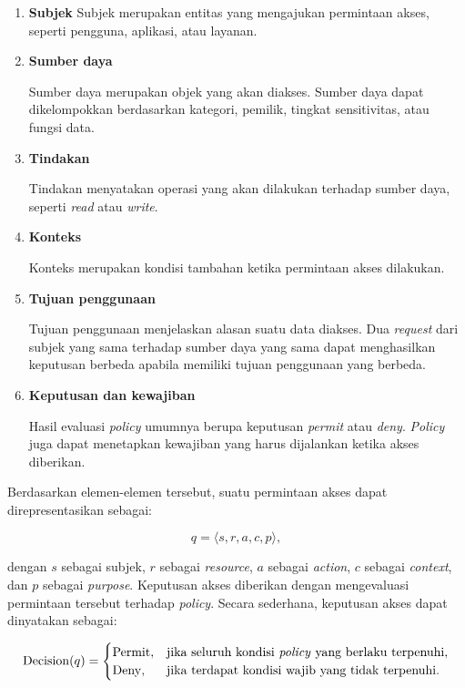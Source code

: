\begin{enumerate}
	\item \textbf{Subjek}
	      Subjek merupakan entitas yang mengajukan permintaan akses, seperti pengguna, aplikasi, atau layanan.

	\item \textbf{Sumber daya}

	      Sumber daya merupakan objek yang akan diakses. Sumber daya dapat dikelompokkan berdasarkan kategori, pemilik, tingkat sensitivitas, atau fungsi data.

	\item \textbf{Tindakan}

	      Tindakan menyatakan operasi yang akan dilakukan terhadap sumber daya, seperti \textit{read} atau \textit{write}.

	\item \textbf{Konteks}

	      Konteks merupakan kondisi tambahan ketika permintaan akses dilakukan.

	\item \textbf{Tujuan penggunaan}

	      Tujuan penggunaan menjelaskan alasan suatu data diakses. Dua \textit{request} dari subjek yang sama terhadap sumber daya yang sama dapat menghasilkan keputusan berbeda apabila memiliki tujuan penggunaan yang berbeda.

	\item \textbf{Keputusan dan kewajiban}

	      Hasil evaluasi \textit{policy} umumnya berupa keputusan \textit{permit} atau \textit{deny}. \textit{Policy} juga dapat menetapkan kewajiban yang harus dijalankan ketika akses diberikan.

\end{enumerate}

Berdasarkan elemen-elemen tersebut, suatu permintaan akses dapat direpresentasikan sebagai:

\begin{equation}
	q = \langle s, r, a, c, p \rangle,
\end{equation}

dengan $s$ sebagai subjek, $r$ sebagai \textit{resource}, $a$ sebagai \textit{action}, $c$ sebagai \textit{context}, dan $p$ sebagai \textit{purpose}. Keputusan akses diberikan dengan mengevaluasi permintaan tersebut terhadap \textit{policy}. Secara sederhana, keputusan akses dapat dinyatakan sebagai:

\begin{equation}
	\operatorname{Decision}(q) =
	\begin{cases}
		\operatorname{Permit}, & \text{jika seluruh kondisi \textit{policy} yang berlaku terpenuhi}, \\
		\operatorname{Deny},   & \text{jika terdapat kondisi wajib yang tidak terpenuhi}.
	\end{cases}
\end{equation}

